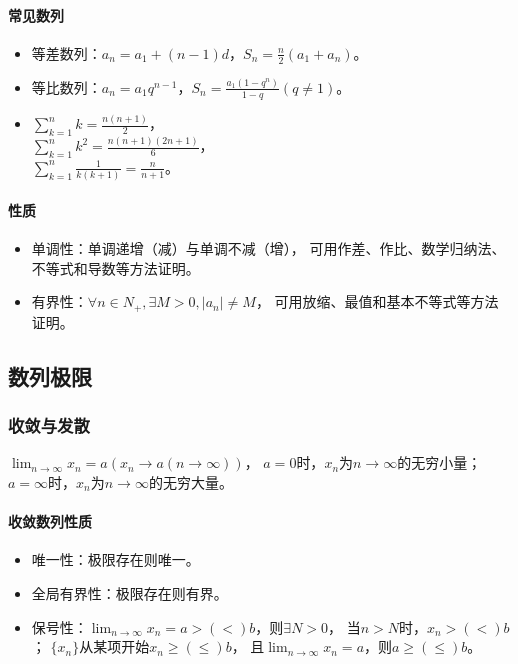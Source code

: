 \documentclass[
12pt, %
a4paper, 
oneside, %
headinclude,footinclude, %
]{scrartcl}
\begin{document}
\paragraph{常见数列}
\begin{itemize}
\item 等差数列：$ a_n = a_1 +(n - 1)d $，$ S_n = \frac{n}{2}(a_1 + a_n) $。
\item 等比数列：$ a_n = a_{1}q^{n - 1} $，$ S_n = \frac{a_1(1 - q^n)}{1 - q}(q \neq 1) $。
\item 
$ \sum_{k = 1}^{n} k = \frac{n(n + 1)}{2} $， \\
$ \sum_{k = 1}^{n} k^2 = \frac{n(n + 1)(2n + 1)}{6} $， \\
$ \sum_{k = 1}^{n} \frac{1}{k(k + 1)} = \frac{n}{n + 1} $。 \\
\end{itemize}
\paragraph{性质}
\begin{itemize}
\item 单调性：单调递增（减）与单调不减（增），
可用作差、作比、数学归纳法、不等式和导数等方法证明。
\item 有界性：$ \forall n \in N_+ ,\exists M > 0, |a_n| \neq M $，
可用放缩、最值和基本不等式等方法证明。
\end{itemize}
\subsection[数列极限]{数列极限}
\subsubsection[收敛与发散]{收敛与发散}
$ \lim_{n \to \infty} x_n = a(x_n \to a(n \to \infty)) $，
$ a = 0 $时，$ x_n $为$ n \to \infty $的无穷小量；
$ a = \infty $时，$ x_n $为$ n \to \infty $的无穷大量。
\paragraph{收敛数列性质}
\begin{itemize}
\item 唯一性：极限存在则唯一。
\item 全局有界性：极限存在则有界。
\item 保号性：$ \lim_{n \to \infty} x_n = a >(<) b $，则$ \exists N > 0 $，
当$ n > N $时，$ x_n >(<) b $； $ \{x_n\} $从某项开始$ x_n \geq(\leq) b $，
且$ \lim_{n \to \infty} x_n = a $，则$ a \geq(\leq) b $。
\end{itemize}
\end{document}
